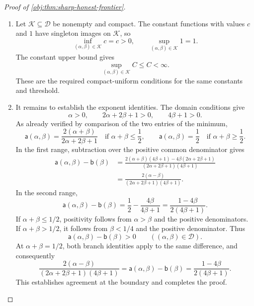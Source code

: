 \begin{proof}[Proof of \cref{obj:thm:sharp-honest-frontier}]
\begin{enumerate}
\item Let \(\mathcal K\subseteq\mathcal D\) be nonempty and compact. The constant
functions with values \(c\) and \(1\) have singleton images on \(\mathcal K\), so
\[
\inf_{(\alpha,\beta)\in\mathcal K}c=c>0,
\qquad
\sup_{(\alpha,\beta)\in\mathcal K}1=1.
\]
The constant upper bound gives
\[
\sup_{(\alpha,\beta)\in\mathcal K}C\le C<\infty.
\]
These are the required compact-uniform conditions for the same constants
and threshold.

\item It remains to establish the exponent identities. The domain conditions give
\[
\alpha>0,\qquad
2\alpha+2\beta+1>0,\qquad
4\beta+1>0.
\]
As already verified by comparison of the two entries of the minimum,
\[
\mathsf a(\alpha,\beta)
=
\frac{2(\alpha+\beta)}{2\alpha+2\beta+1}
\quad\text{if }\alpha+\beta\le\frac12,
\qquad
\mathsf a(\alpha,\beta)=\frac12
\quad\text{if }\alpha+\beta\ge\frac12.
\]
In the first range, subtraction over the positive common denominator gives
\[
\begin{aligned}
\mathsf a(\alpha,\beta)-\mathsf b(\beta)
&=
\frac{
2(\alpha+\beta)(4\beta+1)
-4\beta(2\alpha+2\beta+1)}
{(2\alpha+2\beta+1)(4\beta+1)}\\
&=
\frac{2(\alpha-\beta)}
{(2\alpha+2\beta+1)(4\beta+1)}.
\end{aligned}
\]
In the second range,
\[
\mathsf a(\alpha,\beta)-\mathsf b(\beta)
=
\frac12-\frac{4\beta}{4\beta+1}
=
\frac{1-4\beta}{2(4\beta+1)}.
\]
If \(\alpha+\beta\le1/2\), positivity follows from \(\alpha>\beta\) and
the positive denominators. If \(\alpha+\beta>1/2\), it follows from
\(\beta<1/4\) and the positive denominator. Thus
\[
\mathsf a(\alpha,\beta)-\mathsf b(\beta)>0
\qquad((\alpha,\beta)\in\mathcal D).
\]
At \(\alpha+\beta=1/2\), both branch identities apply to the same difference,
and consequently
\[
\frac{2(\alpha-\beta)}
{(2\alpha+2\beta+1)(4\beta+1)}
=
\mathsf a(\alpha,\beta)-\mathsf b(\beta)
=
\frac{1-4\beta}{2(4\beta+1)}.
\]
This establishes agreement at the boundary and completes the proof.
\end{enumerate}
\end{proof}

